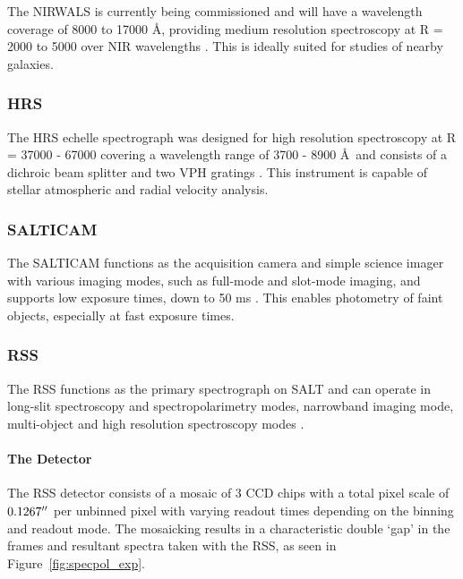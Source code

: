 The \gls{NIRWALS} is currently being commissioned and will have a wavelength coverage of 8000 to 17000 \AA, providing medium resolution spectroscopy at R = 2000 to 5000 over \gls{NIR} wavelengths \citep{NIRWALS, SALT_NIRWALS}. This is ideally suited for studies of nearby galaxies.

\subsubsection{\gls{HRS}}

The \gls{HRS} echelle spectrograph was designed for high resolution spectroscopy at R = 37000 - 67000 covering a wavelength range of 3700 - 8900 \AA\ and consists of a dichroic beam splitter and two \gls{VPH} gratings \citep{SALT_hires}. This instrument is capable of stellar atmospheric and radial velocity analysis.

\subsubsection{\gls{SALTICAM}}

The \gls{SALTICAM} functions as the acquisition camera and simple science imager with various imaging modes, such as full-mode and slot-mode imaging, and supports low exposure times, down to 50 ms \citep{SALTICAM}. This enables photometry of faint objects, especially at fast exposure times.

\subsubsection{\gls{RSS}} \label{subsubsec:RSS}

The \gls{RSS} functions as the primary spectrograph on \gls{SALT} and can operate in long-slit spectroscopy and spectropolarimetry modes, narrowband imaging mode, multi-object and high resolution spectroscopy modes \citep[for an in-depth discussion on operational modes see][or the \href{https://pysalt.salt.ac.za/proposal_calls/current/ProposalCall.html}{latest call for proposals}]{SALT_operational_modes}.

\paragraph{The Detector}
The \gls{RSS} detector consists of a mosaic of 3 \gls{CCD} chips with a total pixel scale of $0.1267\hbox{$^{\prime\prime}$}$ per unbinned pixel with varying readout times depending on the binning and readout mode. The mosaicking results in a characteristic double `gap' in the frames and resultant spectra taken with the \gls{RSS}, as seen in Figure~\ref{fig:specpol_exp}.

